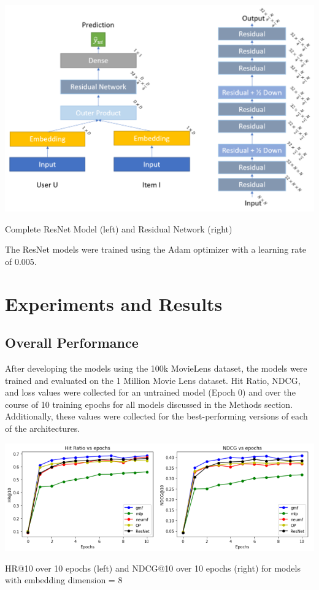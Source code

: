 \documentclass{article}
\begin{document}
\begin{center}
\includegraphics[scale=0.4]{ResNet_Diagram}

Complete ResNet Model (left) and Residual Network (right)
\end{center}

The ResNet models were trained using the Adam optimizer with a learning rate of 0.005.

\section{Experiments and Results}
\subsection{Overall Performance}
After developing the models using the 100k MovieLens dataset, the models were trained and evaluated on the 1 Million Movie Lens dataset. Hit Ratio, NDCG, and loss values were collected for an untrained model (Epoch 0) and over the course of 10 training epochs for all models discussed in the Methods section. Additionally, these values were collected for the best-performing versions of each of the architectures. 

\begin{center}
\includegraphics[scale=0.6]{HR_NDCGs}

HR@10 over 10 epochs (left) and NDCG@10 over 10 epochs (right) for models with embedding dimension = 8
\end{center}
\end{document}
